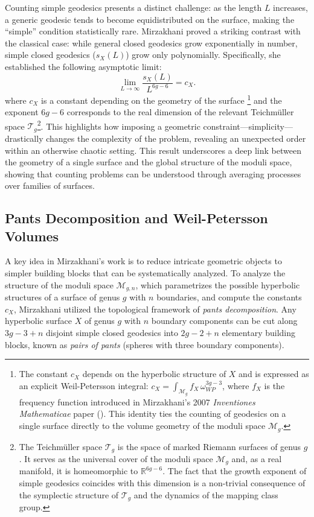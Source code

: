 Counting simple geodesics presents a distinct challenge: as the length $L$ increases, a generic geodesic tends to become equidistributed on the surface, making the ``simple'' condition statistically rare. Mirzakhani proved a striking contrast with the classical case: while general closed geodesics grow exponentially in number, simple closed geodesics ($s_X(L)$) grow only polynomially. Specifically, she established the following asymptotic limit:
\begin{equation}
    \lim_{L\to\infty} \frac{s_X(L)}{L^{6g-6}} = c_X. 
\end{equation}
where $c_X$ is a constant depending on the geometry of the surface \footnote{The constant $c_X$ depends on the hyperbolic structure of $X$ and is expressed as an explicit Weil-Petersson integral: $c_X = \int_{\mathcal{M}_g} f_X \, \omega_{WP}^{3g-3}$, where $f_X$ is the frequency function introduced in Mirzakhani's 2007 \textit{Inventiones Mathematicae} paper (\cite{Mirzakhani2007a}). This identity ties the counting of geodesics on a single surface directly to the volume geometry of the moduli space $\mathcal{M}_g$.} and the exponent $6g-6$ corresponds to the real dimension of the relevant Teichmüller space $\mathcal{T}_g$\footnote{The Teichmüller space $\mathcal{T}_g$ is the space of marked Riemann surfaces of genus $g$. It serves as the universal cover of the moduli space $\mathcal{M}_g$ and, as a real manifold, it is homeomorphic to $\mathbb{R}^{6g-6}$. The fact that the growth exponent of simple geodesics coincides with this dimension is a non-trivial consequence of the symplectic structure of $\mathcal{T}_g$ and the dynamics of the mapping class group.}.
This highlights how imposing a geometric constraint—simplicity—drastically changes the complexity of the problem, revealing an unexpected order within an otherwise chaotic setting.
This result underscores a deep link between the geometry of a single surface and the global structure of the moduli space, showing that counting problems can be understood through averaging processes over families of surfaces.

\subsection{Pants Decomposition and Weil-Petersson Volumes}
A key idea in Mirzakhani's work is to reduce intricate geometric objects to simpler building blocks that can be systematically analyzed.
To analyze the structure of the moduli space $\mathcal{M}_{g,n}$, which parametrizes the possible hyperbolic structures of a surface of genus $g$ with $n$ boundaries, and compute the constants $c_X$, Mirzakhani utilized the topological framework of \textit{pants decomposition}. Any hyperbolic surface $X$ of genus $g$ with $n$ boundary components can be cut along $3g-3+n$ disjoint simple closed geodesics into $2g-2+n$ elementary building blocks, known as \textit{pairs of pants} (spheres with three boundary components). 

